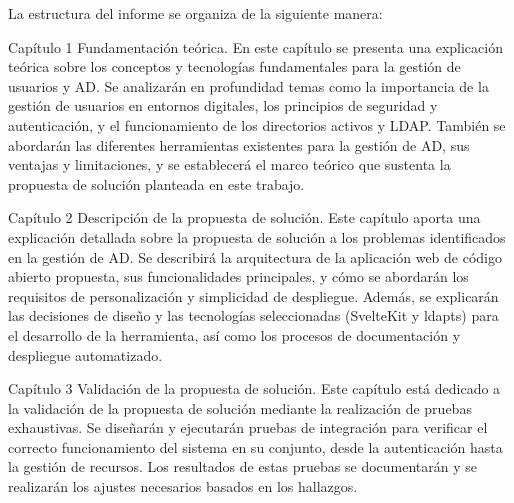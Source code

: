 
La estructura del informe se organiza de la siguiente manera:

Capítulo 1 Fundamentación teórica. En este capítulo se presenta una explicación teórica sobre los conceptos y tecnologías fundamentales para la gestión de usuarios y AD. Se analizarán en profundidad temas como la importancia de la gestión de usuarios en entornos digitales, los principios de seguridad y autenticación, y el funcionamiento de los directorios activos y LDAP. También se abordarán las diferentes herramientas existentes para la gestión de AD, sus ventajas y limitaciones, y se establecerá el marco teórico que sustenta la propuesta de solución planteada en este trabajo.

Capítulo 2 Descripción de la propuesta de solución. Este capítulo aporta una explicación detallada sobre la propuesta de solución a los problemas identificados en la gestión de AD. Se describirá la arquitectura de la aplicación web de código abierto propuesta, sus funcionalidades principales, y cómo se abordarán los requisitos de personalización y simplicidad de despliegue. Además, se explicarán las decisiones de diseño y las tecnologías seleccionadas (SvelteKit y ldapts) para el desarrollo de la herramienta, así como los procesos de documentación y despliegue automatizado.

Capítulo 3 Validación de la propuesta de solución. Este capítulo está dedicado a la validación de la propuesta de solución mediante la realización de pruebas exhaustivas. Se diseñarán y ejecutarán pruebas de integración para verificar el correcto funcionamiento del sistema en su conjunto, desde la autenticación hasta la gestión de recursos. Los resultados de estas pruebas se documentarán y se realizarán los ajustes necesarios basados en los hallazgos.
